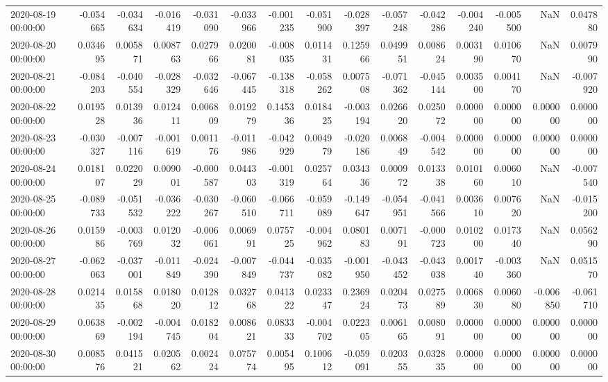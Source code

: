 \begin{tabular}{lrrrrrrrrrrrrrr}
2020-08-19 00:00:00 & -0.054665 & -0.034634 & -0.016419 & -0.031090 & -0.033966 & -0.001235 & -0.051900 & -0.028397 & -0.057248 & -0.042286 & -0.004240 & -0.005500 & NaN & 0.047880 \\
2020-08-20 00:00:00 & 0.034695 & 0.005871 & 0.008763 & 0.027966 & 0.020081 & -0.008035 & 0.011431 & 0.125966 & 0.049951 & 0.008624 & 0.003190 & 0.010670 & NaN & 0.007990 \\
2020-08-21 00:00:00 & -0.084203 & -0.040554 & -0.028329 & -0.032646 & -0.067445 & -0.138318 & -0.058262 & 0.007508 & -0.071362 & -0.045144 & 0.003500 & 0.004170 & NaN & -0.007920 \\
2020-08-22 00:00:00 & 0.019528 & 0.013936 & 0.012411 & 0.006809 & 0.019279 & 0.145336 & 0.018425 & -0.003194 & 0.026620 & 0.025072 & 0.000000 & 0.000000 & 0.000000 & 0.000000 \\
2020-08-23 00:00:00 & -0.030327 & -0.007116 & -0.001619 & 0.001176 & -0.011986 & -0.042929 & 0.004979 & -0.020186 & 0.006849 & -0.004542 & 0.000000 & 0.000000 & 0.000000 & 0.000000 \\
2020-08-24 00:00:00 & 0.018107 & 0.022029 & 0.009001 & -0.000587 & 0.044303 & -0.001319 & 0.025764 & 0.034336 & 0.000972 & 0.013338 & 0.010160 & 0.006010 & NaN & -0.007540 \\
2020-08-25 00:00:00 & -0.089733 & -0.051532 & -0.036222 & -0.030267 & -0.060510 & -0.066711 & -0.059089 & -0.149647 & -0.054951 & -0.041566 & 0.003610 & 0.007620 & NaN & -0.015200 \\
2020-08-26 00:00:00 & 0.015986 & -0.003769 & 0.012032 & -0.006061 & 0.006991 & 0.075725 & -0.004962 & 0.080183 & 0.007191 & -0.000723 & 0.010200 & 0.017340 & NaN & 0.056290 \\
2020-08-27 00:00:00 & -0.062063 & -0.037001 & -0.011849 & -0.024390 & -0.007849 & -0.044737 & -0.035082 & -0.001950 & -0.043452 & -0.043038 & 0.001740 & -0.003360 & NaN & 0.051570 \\
2020-08-28 00:00:00 & 0.021435 & 0.015868 & 0.018020 & 0.012812 & 0.032768 & 0.041322 & 0.023347 & 0.236924 & 0.020473 & 0.027589 & 0.006830 & 0.006080 & -0.006850 & -0.061710 \\
2020-08-29 00:00:00 & 0.063869 & -0.002194 & -0.004745 & 0.018204 & 0.008621 & 0.083333 & -0.004702 & 0.022305 & 0.006165 & 0.008091 & 0.000000 & 0.000000 & 0.000000 & 0.000000 \\
2020-08-30 00:00:00 & 0.008576 & 0.041521 & 0.020562 & 0.002424 & 0.075774 & 0.005495 & 0.100612 & -0.059091 & 0.020355 & 0.032835 & 0.000000 & 0.000000 & 0.000000 & 0.000000 \\

\end{tabular}
